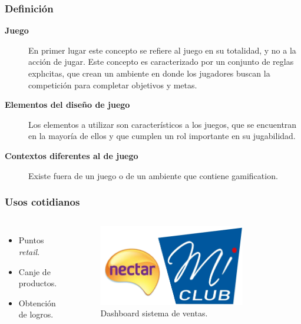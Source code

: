 \documentclass[10pt, compress]{beamer}
\begin{document}
\begin{frame}
\frametitle{Definición}

\begin{description}
 \item[\textbf{Juego}] En primer lugar este concepto se refiere al juego en su totalidad, y no a la acción de jugar. 
Este concepto es caracterizado por un conjunto de reglas explıcitas, que crean un ambiente en donde los 
jugadores buscan la competición para completar objetivos y metas.
 \item[\textbf{Elementos del diseño de juego}] Los elementos a utilizar son característicos a los juegos, que se 
encuentran en la mayoría de ellos y que cumplen un rol importante en su jugabilidad.
 \item[\textbf{Contextos diferentes al de juego}] Existe fuera de un juego o de un ambiente que contiene gamification.
\end{description}
\end{frame}

\begin{frame}
 \frametitle{Usos cotidianos}
\begin{columns}[onlytextwidth]

        \begin{itemize}[<+- | alert@+>]
          \item Puntos \emph{retail}.
          \item Canje de productos.
	  \item Obtención de logros.
        \end{itemize}

\begin{figure}
\centering
    \includegraphics[width=0.8\textwidth]{images/retail.png}
    \caption{Dashboard sistema de ventas.}
    \label{fig:awesome_image}
\end{figure}
\end{columns}
\end{frame}
\end{document}
